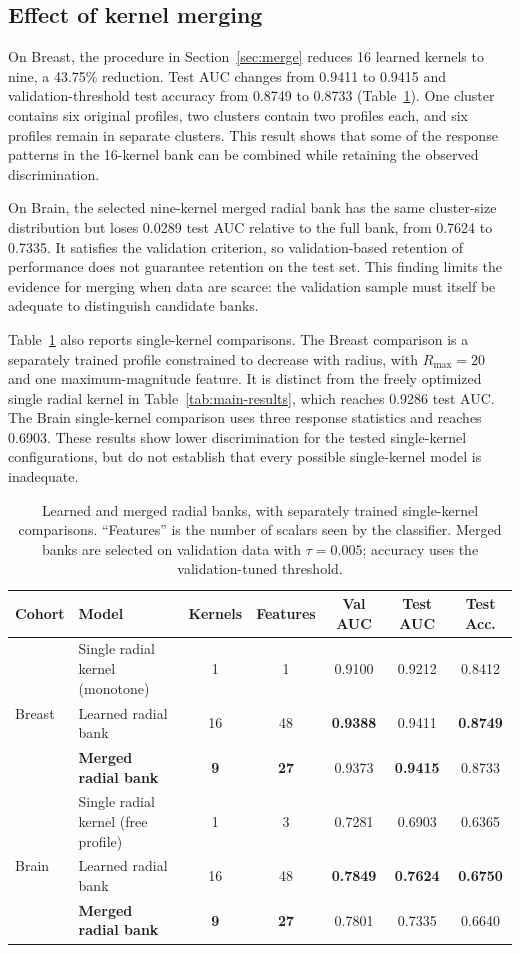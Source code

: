 \documentclass[10pt,twocolumn]{article}
\begin{document}
\subsection{Effect of kernel merging}
On Breast, the procedure in Section~\ref{sec:merge} reduces 16 learned kernels to nine, a 43.75\% reduction. Test AUC changes from 0.9411 to 0.9415 and validation-threshold test accuracy from 0.8749 to 0.8733 (Table~\ref{tab:minimal-bank}). One cluster contains six original profiles, two clusters contain two profiles each, and six profiles remain in separate clusters. This result shows that some of the response patterns in the 16-kernel bank can be combined while retaining the observed discrimination.

On Brain, the selected nine-kernel merged radial bank has the same cluster-size distribution but loses 0.0289 test AUC relative to the full bank, from 0.7624 to 0.7335. It satisfies the validation criterion, so validation-based retention of performance does not guarantee retention on the test set. This finding limits the evidence for merging when data are scarce: the validation sample must itself be adequate to distinguish candidate banks.

Table~\ref{tab:minimal-bank} also reports single-kernel comparisons. The Breast comparison is a separately trained profile constrained to decrease with radius, with $R_{\max}=20$ and one maximum-magnitude feature. It is distinct from the freely optimized single radial kernel in Table~\ref{tab:main-results}, which reaches 0.9286 test AUC. The Brain single-kernel comparison uses three response statistics and reaches 0.6903. These results show lower discrimination for the tested single-kernel configurations, but do not establish that every possible single-kernel model is inadequate.

\begin{table}[!t]
\centering
\caption{Learned and merged radial banks, with separately trained single-kernel comparisons. ``Features'' is the number of scalars seen by the classifier. Merged banks are selected on validation data with $\tau=0.005$; accuracy uses the validation-tuned threshold.}
\label{tab:minimal-bank}
\small
\begin{tabular}{llccccc}
\toprule
Cohort & Model & Kernels & Features & Val AUC & Test AUC & Test Acc.\\
\midrule
\multirow{3}{*}{Breast} & Single radial kernel (monotone) & 1 & 1 & 0.9100 & 0.9212 & 0.8412\\
 & Learned radial bank & 16 & 48 & \textbf{0.9388} & 0.9411 & \textbf{0.8749}\\
 & \textbf{Merged radial bank} & \textbf{9} & \textbf{27} & 0.9373 & \textbf{0.9415} & 0.8733\\
\midrule
\multirow{3}{*}{Brain} & Single radial kernel (free profile) & 1 & 3 & 0.7281 & 0.6903 & 0.6365\\
 & Learned radial bank & 16 & 48 & \textbf{0.7849} & \textbf{0.7624} & \textbf{0.6750}\\
 & \textbf{Merged radial bank} & \textbf{9} & \textbf{27} & 0.7801 & 0.7335 & 0.6640\\
\bottomrule
\end{tabular}
\end{table}
\end{document}

